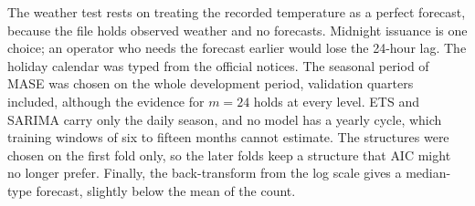\documentclass[12pt,a4paper,openany]{report}
\begin{document}
The weather test rests on treating the recorded temperature as a perfect forecast, because the file holds observed
weather and no forecasts. Midnight issuance is one choice; an operator who needs the forecast
earlier would lose the 24-hour lag. The holiday calendar was typed from the official notices. The seasonal period of
\ac{MASE} was chosen on the whole development period, validation quarters included, although the evidence for $m =
24$ holds at every level. \ac{ETS} and \ac{SARIMA} carry only the daily season, and no model has a yearly cycle,
which training windows of six to fifteen months cannot estimate. The structures were chosen on the first fold only,
so the later folds keep a structure that \ac{AIC} might no longer prefer. Finally, the back-transform from the log
scale gives a median-type forecast, slightly below the mean of the count.
\end{document}
